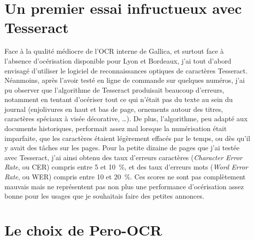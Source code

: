 \section{Un premier essai infructueux avec Tesseract}

Face à la qualité médiocre de l’OCR interne de Gallica, et surtout face à l’absence d’océrisation disponible pour Lyon et Bordeaux, j’ai tout d’abord envisagé d’utiliser le logiciel de reconnaissances optiques de caractères Tesseract. Néanmoins, après l’avoir testé en ligne de commande sur quelques numéros, j’ai pu observer que l’algorithme de Tesseract produisait beaucoup d’erreurs, notamment en tentant d’océriser tout ce qui n’était pas du texte au sein du journal (enjolivures en haut et bas de page, ornements autour des titres, caractères spéciaux à visée décorative, …). De plus, l’algorithme, peu adapté aux documents historiques, performait assez mal lorsque la numérisation était imparfaite, que les caractères étaient légèrement effacés par le temps, ou dès qu’il y avait des tâches sur les pages. Pour la petite dizaine de pages que j’ai testée avec Tesseract, j’ai ainsi obtenu des taux d’erreurs caractères (\textit{Character Error Rate}, ou CER) compris entre 5 et 10 \%, et des taux d’erreurs mots (\textit{Word Error Rate}, ou WER) compris entre 10 et 20 \%. Ces scores ne sont pas complètement mauvais mais ne représentent pas non plus une performance d’océrisation assez bonne pour les usages que je souhaitais faire des petites annonces.


\section{Le choix de Pero-OCR}

